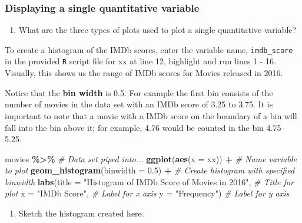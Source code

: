\documentclass[
]{report}
\newenvironment{Shaded}{\begin{snugshade}}{\end{snugshade}}
\newcommand{\CommentTok}[1]{\textcolor[rgb]{0.56,0.35,0.01}{\textit{#1}}}
\newcommand{\DataTypeTok}[1]{\textcolor[rgb]{0.13,0.29,0.53}{#1}}
\newcommand{\FloatTok}[1]{\textcolor[rgb]{0.00,0.00,0.81}{#1}}
\newcommand{\KeywordTok}[1]{\textcolor[rgb]{0.13,0.29,0.53}{\textbf{#1}}}
\newcommand{\NormalTok}[1]{#1}
\newcommand{\OperatorTok}[1]{\textcolor[rgb]{0.81,0.36,0.00}{\textbf{#1}}}
\newcommand{\StringTok}[1]{\textcolor[rgb]{0.31,0.60,0.02}{#1}}
\providecommand{\tightlist}{%
  \setlength{\itemsep}{0pt}\setlength{\parskip}{0pt}}
\begin{document}
\hypertarget{displaying-a-single-quantitative-variable}{%
\subsubsection*{Displaying a single quantitative variable}\label{displaying-a-single-quantitative-variable}}

\begin{enumerate}
\def\labelenumi{\arabic{enumi}.}
\setcounter{enumi}{6}
\tightlist
\item
  What are the three types of plots used to plot a single quantitative variable?
\end{enumerate}

\newpage

To create a histogram of the IMDb scores, enter the variable name, \texttt{imdb\_score} in the provided \texttt{R} script file for xx at line 12, highlight and run lines 1 - 16. Visually, this shows us the range of IMDb scores for Movies released in 2016.

Notice that the \textbf{bin width} is 0.5. For example the first bin consists of the number of movies in the data set with an IMDb score of 3.25 to 3.75. It is important to note that a movie with a IMDb score on the boundary of a bin will fall into the bin above it; for example, 4.76 would be counted in the bin 4.75--5.25.

\begin{Shaded}
\begin{Highlighting}[]
\NormalTok{movies }\OperatorTok{\%\textgreater{}\%}\StringTok{ }\CommentTok{\# Data set piped into...}
\KeywordTok{ggplot}\NormalTok{(}\KeywordTok{aes}\NormalTok{(}\DataTypeTok{x =}\NormalTok{ xx)) }\OperatorTok{+}\StringTok{   }\CommentTok{\# Name variable to plot}
\StringTok{  }\KeywordTok{geom\_histogram}\NormalTok{(}\DataTypeTok{binwidth =} \FloatTok{0.5}\NormalTok{) }\OperatorTok{+}\StringTok{  }\CommentTok{\# Create histogram with specified binwidth}
\StringTok{  }\KeywordTok{labs}\NormalTok{(}\DataTypeTok{title =} \StringTok{"Histogram of IMDb Score of Movies in 2016"}\NormalTok{, }\CommentTok{\# Title for plot}
       \DataTypeTok{x =} \StringTok{"IMDb Score"}\NormalTok{, }\CommentTok{\# Label for x axis}
       \DataTypeTok{y =} \StringTok{"Frequency"}\NormalTok{) }\CommentTok{\# Label for y axis}
\end{Highlighting}
\end{Shaded}

\begin{enumerate}
\def\labelenumi{\arabic{enumi}.}
\setcounter{enumi}{7}
\tightlist
\item
  Sketch the histogram created here.
\end{enumerate}
\end{document}
